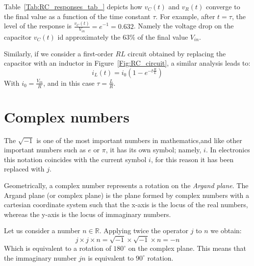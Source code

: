 Table~\ref{Tab:RC_responses_tab_} depicts how $v_C(t)$ and $v_R(t)$ converge to the final value as a function of the time constant $\tau$. For example, after $t=\tau$, the level of the response is $\frac{v_C(t)}{V_{in}} = e^{-1} = 0.632$. Namely the voltage drop on the capacitor $v_C(t)$ id approximately the $63\%$ of the final value $V_{in}$.

Similarly, if we consider a first-order $RL$ circuit obtained by replacing the capacitor with an inductor in Figure~\ref{Fig:RC_circuit}, a similar analysis leads to:
\begin{equation}
i_L(t)= i_0\left(1 - e^{-t\frac{R}{L}}\right)
\end{equation}
 With $i_0=\frac{V_{in}}{R}$, and in this case $\tau = \frac{L}{R}$.

\section{Complex numbers}
The $\sqrt{-1}$ is one of the most important numbers in mathematics,and like other important numbers such as $e$ or $\pi$, it has its own symbol; namely, $i$. In electronics this notation coincides with the current symbol $i$, for this reason it has been replaced with $j$.

Geometrically, a complex number represents a rotation on the \emph{Argand plane}. The Argand plane (or complex plane) is the plane formed by complex numbers with a cartesian coordinate system such that the x-axis is the locus of the real numbers, whereas the y-axis is the locus of immaginary numbers.

Let us consider a number $n\in\mathbb{R}$. Applying twice the operator $j$ to $n$ we obtain:
\[j\times j \times n = \sqrt{-1} \times \sqrt{-1} \times n = -n\]
Which is equivalent to a rotation of $180^{\circ}$ on the complex plane. This means that the immaginary number $jn$ is equivalent to $90^{\circ}$ rotation.

